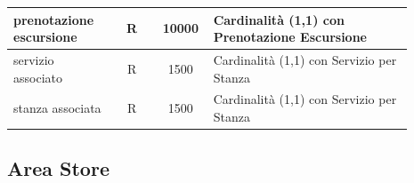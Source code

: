 \documentclass[12pt,a4paper]{article}
\begin{document}
\begin{center}
\begin{longtable}{|p{0.23\linewidth}|p{0.1\linewidth}|p{0.11\linewidth}|p{0.45\linewidth}|}
\hline
prenotazione escursione
 & 
\multicolumn{1}{|c|}{R}
 & 
\multicolumn{1}{|c|}{10000}
 & 
Cardinalità (1,1) con Prenotazione Escursione
\\

\hline
servizio associato
 & 
\multicolumn{1}{|c|}{R}
 & 
\multicolumn{1}{|c|}{1500}
 & 
Cardinalità (1,1) con Servizio per Stanza
\\

\hline
stanza associata
 & 
\multicolumn{1}{|c|}{R}
 & 
\multicolumn{1}{|c|}{1500}
 & 
Cardinalità (1,1) con Servizio per Stanza
\\

\hline

\end{longtable}\end{center}


\subsection{Area Store}
\end{document}
